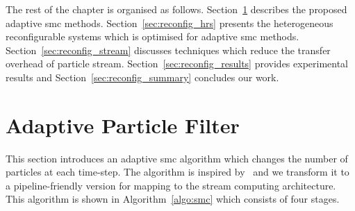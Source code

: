 The rest of the chapter is organised as follows.
Section~\ref{sec:reconfig_asmc} describes the proposed adaptive \gls{smc} methods.
Section~\ref{sec:reconfig_hrs} presents the heterogeneous reconfigurable systems which is optimised for adaptive \gls{smc} methods.
Section~\ref{sec:reconfig_stream} discusses techniques which reduce the transfer overhead of particle stream.
Section~\ref{sec:reconfig_results} provides experimental results and
Section~\ref{sec:reconfig_summary} concludes our work.

\section{Adaptive Particle Filter}
\label{sec:reconfig_asmc}

This section introduces an adaptive \gls{smc} algorithm which changes the number of particles at each time-step.
The algorithm is inspired by~\cite{liu07} and we transform it to a pipeline-friendly version for mapping to the stream computing architecture.
This algorithm is shown in Algorithm~\ref{algo:smc} which consists of four stages.

